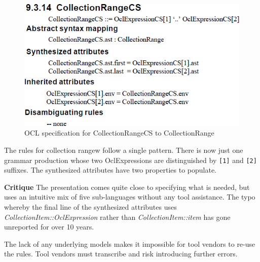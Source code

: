 \documentclass{llncs}
\begin{document}
\begin{figure}[htbp]
\centering
\includegraphics[scale=0.45]{images/CollectionRangeOMG.png}
\caption{OCL specification for CollectionRangeCS to CollectionRange}
\label{fig:CollectionRangeOMG}
\end{figure}
The rules for collection rangew follow a single pattern. There is now just one grammar production whose two OclExpressions are distinguished by \verb$[1]$ and \verb$[2]$ suffixes. The synthesized attributes have two properties to populate.

\textbf{Critique} The presentation comes quite close to specifying what is needed, but uses an intuitive mix of five sub-languages without any tool assistance. The typo whereby the final line of the synthesized attributes uses \emph{CollectionItem::OclExpression} rather than \emph{CollectionItem::item} has gone unreported for over 10 years.

The lack of any underlying models makes it impossible for tool vendors to re-use the rules. Tool vendors must transcribe and risk introducing further errors.


\end{document}
